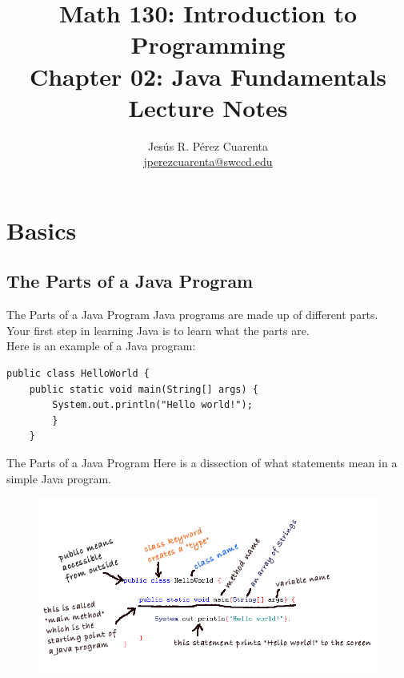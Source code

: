 \documentclass[11pt]{beamer}
\title[Chapter 02 Notes]{Math 130: Introduction to Programming \\ Chapter 02: Java Fundamentals \\ Lecture Notes}
\author{
    Jesús R. Pérez Cuarenta \\
    \href{mailto:jperezcuarenta@swccd.edu}{jperezcuarenta@swccd.edu}
    }
\date{}
\begin{document}
  \section{}
  \begin{frame}
    \maketitle
  \end{frame}

  \begin{frame}
    \begin{multicols}{2}
        \tableofcontents
        \end{multicols}
  \end{frame}

\section{Basics}
\subsection{The Parts of a Java Program}
\begin{frame}[fragile]{The Parts of a Java Program}
    Java programs are made up of different parts. \\ \vspace{1em}
    Your first step in learning Java is to learn what the parts are. \\ \vspace{1em}
    Here is an example of a Java program:
    \begin{lstlisting}
public class HelloWorld {
    public static void main(String[] args) {
        System.out.println("Hello world!");
        }
    }
    \end{lstlisting}
\end{frame}

\begin{frame}[fragile]{The Parts of a Java Program}
    Here is a dissection of what statements mean in a simple Java program.
    \noindent
    \begin{figure}[H]
    \centering
    \includegraphics[scale=0.5]{Images/chapter02_section01_01.png}
    \end{figure}
\end{frame}
\end{document}
